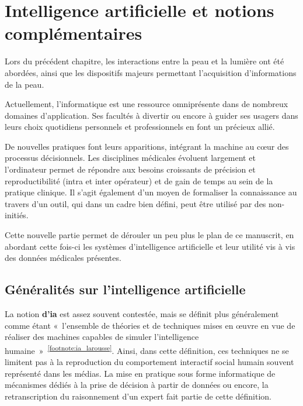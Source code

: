 \renewcommand{\thechapter}{\arabic{chapter}}
\setcounter{chapter}{2}

\chapter{Intelligence artificielle et notions complémentaires}
\label{chap:chapter_3}
\chapterintro
Lors du précédent chapitre, les interactions entre la peau et la lumière ont été abordées, ainsi que les dispositifs majeurs permettant l'acquisition d'informations de la peau.\par

Actuellement, l’informatique est une ressource omniprésente dans de nombreux domaines d’application. Ses facultés à divertir ou encore à guider ses usagers dans leurs choix quotidiens personnels et professionnels en font un précieux allié.\par 

De nouvelles pratiques font leurs apparitions, intégrant la machine au cœur des processus décisionnels. Les disciplines médicales évoluent largement et l’ordinateur permet de répondre aux besoins croissants de précision et reproductibilité (intra et inter opérateur) et de gain de temps au sein de la pratique clinique. Il s’agit également d’un moyen de formaliser la connaissance au travers d’un outil, qui dans un cadre bien défini, peut être utilisé par des non-initiés.\par

Cette nouvelle partie permet de dérouler un peu plus le plan de ce manuscrit, en abordant cette fois-ci les systèmes d'intelligence artificielle et leur utilité vis à vis des données médicales présentes.\par
\newpage

\section{Généralités sur l'intelligence artificielle}
\label{sec:artificial_intelligence}
La notion \textbf{d’\gls{ia}} est assez souvent contestée, mais se définit plus généralement comme étant «~l’ensemble de théories et de techniques mises en œuvre en vue de réaliser des machines capables de simuler l'intelligence humaine~»~\textsuperscript{\ref{footnote:ia_larousse}}. Ainsi, dans cette définition, ces techniques ne se limitent pas à la reproduction du comportement interactif social humain souvent représenté dans les médias. La mise en pratique sous forme informatique de mécanismes dédiés à la prise de décision à partir de données ou encore, la retranscription du raisonnement d'un expert fait partie de cette définition.\par

